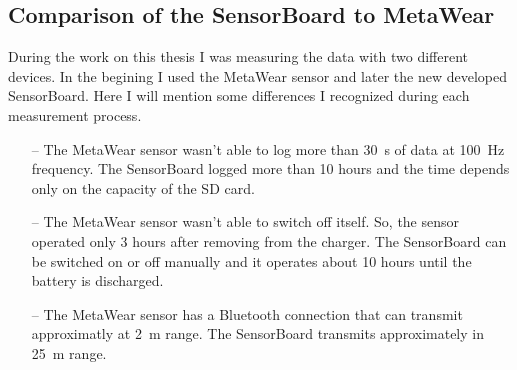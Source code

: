 \subsection{Comparison of the SensorBoard to MetaWear}
During the work on this thesis I was measuring the data with two different devices. In the begining I used the MetaWear \cite{MetaWear} sensor and later the new developed SensorBoard. Here I will mention some differences I recognized during each measurement process.
\begin{itemize}
	\item[--] The MetaWear sensor wasn't able to log more than \SI{30}{s} of data at \SI{100}{Hz} frequency. The SensorBoard logged more than 10 hours and the time depends only on the capacity of the SD card.
	\item[--] The MetaWear sensor wasn't able to switch off itself. So, the sensor operated only 3 hours after removing from the charger. The SensorBoard can be switched on or off manually and it operates about 10 hours until the battery is discharged.
	\item[--] The MetaWear sensor has a Bluetooth connection that can transmit approximatly at \SI{2}{m} range. The SensorBoard transmits approximately in \SI{25}{m} range.
\end{itemize}
